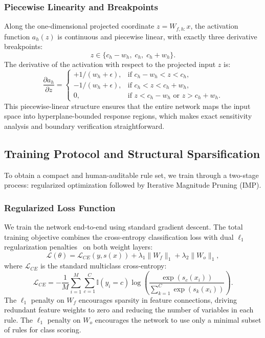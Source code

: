 \subsubsection{Piecewise Linearity and Breakpoints}
Along the one-dimensional projected coordinate $z = W_{f,h:} x$, the activation function $a_h(z)$ is continuous and piecewise linear, with exactly three derivative breakpoints:
\begin{equation}
z \in \{ c_h - w_h, \; c_h, \; c_h + w_h \}.
\end{equation}
The derivative of the activation with respect to the projected input $z$ is:
\begin{equation}
\frac{\partial a_h}{\partial z} = 
\begin{cases}
+1 / (w_h + \epsilon), & \text{if } c_h - w_h < z < c_h, \\
-1 / (w_h + \epsilon), & \text{if } c_h < z < c_h + w_h, \\
0, & \text{if } z < c_h - w_h \text{ or } z > c_h + w_h.
\end{cases}
\end{equation}
This piecewise-linear structure ensures that the entire network maps the input space into hyperplane-bounded response regions, which makes exact sensitivity analysis and boundary verification straightforward.


\subsection{Training Protocol and Structural Sparsification}
\label{subsec:pruning}

To obtain a compact and human-auditable rule set, we train \modelname{} through a two-stage process: regularized optimization followed by Iterative Magnitude Pruning (IMP).

\subsubsection{Regularized Loss Function}
We train the network end-to-end using standard gradient descent. The total training objective combines the cross-entropy classification loss with dual $\ell_1$ regularization penalties~\cite{tibshirani1996lasso} on both weight layers:
\begin{equation}
\label{eq:total_loss}
\mathcal{L}(\theta) = \mathcal{L}_{CE}(y, s(x)) + \lambda_1 \|W_f\|_1 + \lambda_2 \|W_o\|_1,
\end{equation}
where $\mathcal{L}_{CE}$ is the standard multiclass cross-entropy:
\begin{equation}
\mathcal{L}_{CE} = - \frac{1}{M} \sum_{i=1}^M \sum_{c=1}^C \mathbb{I}(y_i = c) \log \left( \frac{\exp(s_c(x_i))}{\sum_{k=1}^C \exp(s_k(x_i))} \right).
\end{equation}
The $\ell_1$ penalty on $W_f$ encourages sparsity in feature connections, driving redundant feature weights to zero and reducing the number of variables in each rule. The $\ell_1$ penalty on $W_o$ encourages the network to use only a minimal subset of rules for class scoring.

